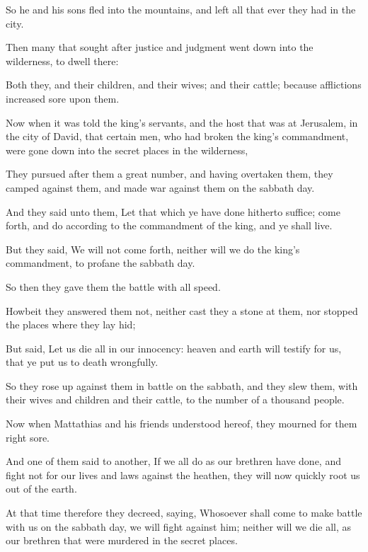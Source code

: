 {\par }{\PP {}So he and his sons fled into the mountains, and left all that ever they had in the city.
\par }{\PP {}Then many that sought after justice and judgment went down into the wilderness, to dwell there:
\par }{\PP {}Both they, and their children, and their wives; and their cattle; because afflictions increased sore upon them.
\par }{\PP {}Now when it was told the king’s servants, and the host that was at Jerusalem, in the city of David, that certain men, who had broken the king’s commandment, were gone down into the secret places in the wilderness,
\par }{\PP {}They pursued after them a great number, and having overtaken them, they camped against them, and made war against them on the sabbath day.
\par }{\PP {}And they said unto them, Let that which ye have done hitherto suffice; come forth, and do according to the commandment of the king, and ye shall live.
\par }{\PP {}But they said, We will not come forth, neither will we do the king’s commandment, to profane the sabbath day.
\par }{\PP {}So then they gave them the battle with all speed.
\par }{\PP {}Howbeit they answered them not, neither cast they a stone at them, nor stopped the places where they lay hid;
\par }{\PP {}But said, Let us die all in our innocency: heaven and earth will testify for us, that ye put us to death wrongfully.
\par }{\PP {}So they rose up against them in battle on the sabbath, and they slew them, with their wives and children and their cattle, to the number of a thousand people.
\par }{\PP {}Now when Mattathias and his friends understood hereof, they mourned for them right sore.
\par }{\PP {}And one of them said to another, If we all do as our brethren have done, and fight not for our lives and laws against the heathen, they will now quickly root us out of the earth.
\par }{\PP {}At that time therefore they decreed, saying, Whosoever shall come to make battle with us on the sabbath day, we will fight against him; neither will we die all, as our brethren that were murdered in the secret places.
}

